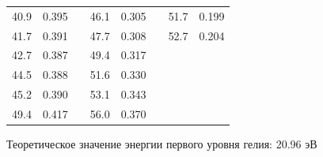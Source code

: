 \documentclass[a4paper,12pt]{article} %
\begin{document}
\begin{table}[h!]
\begin{tabular}{cclcclcc}
				\multicolumn{1}{|c|}{40.9}               & \multicolumn{1}{c|}{0.395} & \multicolumn{1}{l|}{} & \multicolumn{1}{c|}{46.1}       & \multicolumn{1}{c|}{0.305} & \multicolumn{1}{l|}{} & \multicolumn{1}{c|}{51.7}       & \multicolumn{1}{c|}{0.199} \\ \cline{1-2} \cline{4-5} \cline{7-8} 
				\multicolumn{1}{|c|}{41.7}               & \multicolumn{1}{c|}{0.391} & \multicolumn{1}{l|}{} & \multicolumn{1}{c|}{47.7}       & \multicolumn{1}{c|}{0.308} & \multicolumn{1}{l|}{} & \multicolumn{1}{c|}{52.7}       & \multicolumn{1}{c|}{0.204} \\ \cline{1-2} \cline{4-5} \cline{7-8} 
				\multicolumn{1}{|c|}{42.7}               & \multicolumn{1}{c|}{0.387} & \multicolumn{1}{l|}{} & \multicolumn{1}{c|}{49.4}       & \multicolumn{1}{c|}{0.317} &                       & \multicolumn{1}{l}{}            & \multicolumn{1}{l}{}       \\ \cline{1-2} \cline{4-5}
				\multicolumn{1}{|c|}{44.5}               & \multicolumn{1}{c|}{0.388} & \multicolumn{1}{l|}{} & \multicolumn{1}{c|}{51.6}       & \multicolumn{1}{c|}{0.330} &                       & \multicolumn{1}{l}{}            & \multicolumn{1}{l}{}       \\ \cline{1-2} \cline{4-5}
				\multicolumn{1}{|c|}{45.2}               & \multicolumn{1}{c|}{0.390} & \multicolumn{1}{l|}{} & \multicolumn{1}{c|}{53.1}       & \multicolumn{1}{c|}{0.343} &                       & \multicolumn{1}{l}{}            & \multicolumn{1}{l}{}       \\ \cline{1-2} \cline{4-5}
				\multicolumn{1}{|c|}{49.4}               & \multicolumn{1}{c|}{0.417} & \multicolumn{1}{l|}{} & \multicolumn{1}{c|}{56.0}       & \multicolumn{1}{c|}{0.370} &                       & \multicolumn{1}{l}{}            & \multicolumn{1}{l}{}       \\ \cline{1-2} \cline{4-5}
				\end{tabular}
			\end{table}\par
			
	Теоретическое значение энергии первого уровня гелия: 20.96 эВ

			
\end{document}
